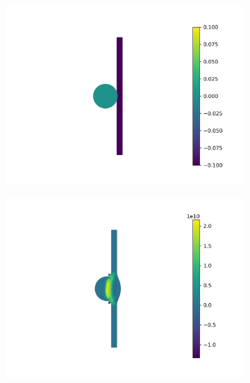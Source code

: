 \documentclass[preprint,12pt]{elsarticle}
\begin{document}
\begin{figure}[!htpb]
  \centering
  \begin{subfigure}{0.3\textwidth}
    \centering
    \includegraphics[width=1\linewidth]{fig_30_a}
    \label{}
  \end{subfigure}
%
  \begin{subfigure}{0.3\textwidth}
    \centering
    \includegraphics[width=1\linewidth]{fig_30_b}
    \label{}
  \end{subfigure}
%
  \begin{subfigure}{0.3\textwidth}

\end{subfigure}
\end{figure}
\end{document}
